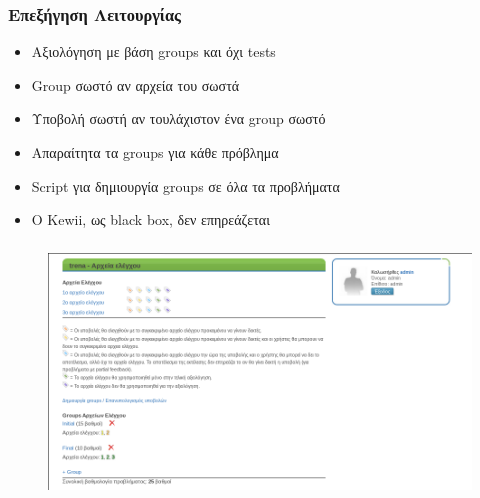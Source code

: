 \documentclass{beamer}
\begin{document}
\begin{frame}
  \frametitle{Επεξήγηση Λειτουργίας}

  \begin{itemize}
      \item Αξιολόγηση με βάση groups και όχι tests
      \item Group σωστό αν αρχεία του σωστά
      \item Υποβολή σωστή αν τουλάχιστον ένα group σωστό
      \item Απαραίτητα τα groups για κάθε πρόβλημα
      \item Script για δημιουργία groups σε όλα τα προβλήματα
      \item Ο Kewii, ως black box, δεν επηρεάζεται
  \end{itemize}
\end{frame}

\begin{frame}
  \frametitle{}
  \begin{figure}

    \includegraphics[scale=0.4,trim=4 4 4 4,clip]{../Figures/groupoverview.png}
  \end{figure}
\end{frame}
\end{document}
